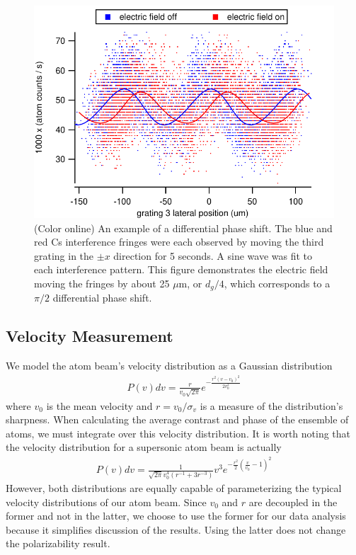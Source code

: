 \documentclass[twocolumn, prl,showpacs,superscriptaddress]{revtex4-1}   %
\begin{document}
\begin{figure}
\includegraphics[width=\linewidth,keepaspectratio]{countsVsGratingPos_150420.pdf}
\caption{\label{phaseShiftExample}(Color online) An example of a differential phase shift. The blue and red Cs interference fringes were each observed by moving the third grating in the $\pm x$ direction for 5 seconds. A sine wave was fit to each interference pattern. This figure demonstrates the electric field moving the fringes by about 25 $\mu$m, or $d_g/4$, which corresponds to a $\pi/2$ differential phase shift.}
\end{figure}

\subsection{Velocity Measurement}

We model the atom beam's velocity distribution as a Gaussian distribution
\begin{align}
	P(v)dv = \frac{r}{v_0\sqrt{2\pi}}e^{-\frac{r^2(v-v_0)^2}{2v_0^2}}
	\label{PvelGaussian}
\end{align}
where $v_0$ is the mean velocity and $r = v_0/\sigma_v$ is a measure of the distribution's sharpness. When calculating the average contrast and phase of the ensemble of atoms, we must integrate over this velocity distribution. It is worth noting that the velocity distribution for a supersonic atom beam is actually
\begin{align}
	P(v)dv = \frac{1}{\sqrt{2\pi}v_0^4(r^{-1}+3r^{-3})}
	v^3
	e^{-\frac{r^2}{2}\left(\frac{v}{v_0}-1\right)^2}
	\label{PvelCubed}
\end{align}
However, both distributions are equally capable of parameterizing the typical velocity distributions of our atom beam. Since $v_0$ and $r$ are decoupled in the former and not in the latter, we choose to use the former for our data analysis because it simplifies discussion of the results. Using the latter does not change the polarizability result. 
\end{document}

